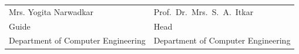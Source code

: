 \vspace{2.5cm}

\begin{center}
\begin{tabular}{>{\centering\arraybackslash}p{}
                >{\centering\arraybackslash}p{}}
  Mrs. Yogita Narwadkar & Prof.\ Dr.\ Mrs.\ S.\ A.\ Itkar \\[2pt]
  Guide        & Head                             \\[2pt]
  Department of Computer Engineering & Department of Computer Engineering \\
\end{tabular}
\end{center}
